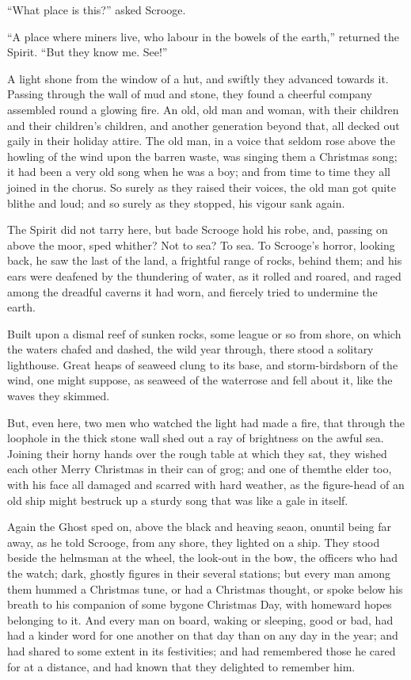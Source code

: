 \documentclass[paper=5.5in:8.5in,BCOR=10mm,twoside,DIV=15,12pt,usegeometry,openany]{scrbook} %
\begin{document}
\enquote{What place is this?} asked Scrooge.

\enquote{A place where miners live, who labour in the bowels of the earth,} returned the Spirit. \enquote{But they know me. See!}

A light shone from the window of a hut, and swiftly they advanced towards it. Passing through the wall of mud and stone, they found a cheerful company assembled round a glowing fire. An old, old man and woman, with their children and their children's children, and another generation beyond that, all decked out gaily in their holiday attire. The old man, in a voice that seldom rose above the howling of the wind upon the barren waste, was singing them a Christmas song; it had been a very old song when he was a boy; and from time to time they all joined in the chorus. So surely as they raised their voices, the old man got quite blithe and loud; and so surely as they stopped, his vigour sank again.

The Spirit did not tarry here, but bade Scrooge hold his robe, and, passing on above the moor, sped whither? Not to sea? To sea. To Scrooge's horror, looking back, he saw the last of the land, a frightful range of rocks, behind them; and his ears were deafened by the thundering of water, as it rolled and roared, and raged among the dreadful caverns it had worn, and fiercely tried to undermine the earth.

Built upon a dismal reef of sunken rocks, some league or so from shore, on which the waters chafed and dashed, the wild year through, there stood a solitary lighthouse. Great heaps of seaweed clung to its base, and storm-birds\textemdash born of the wind, one might suppose, as seaweed of the water\textemdash rose and fell about it, like the waves they skimmed.

But, even here, two men who watched the light had made a fire, that through the loophole in the thick stone wall shed out a ray of brightness on the awful sea. Joining their horny hands over the rough table at which they sat, they wished each other Merry Christmas in their can of grog; and one of them\textemdash the elder too, with his face all damaged and scarred with hard weather, as the figure-head of an old ship might be\textemdash struck up a sturdy song that was like a gale in itself.

Again the Ghost sped on, above the black and heaving sea\textemdash on, on\textemdash until being far away, as he told Scrooge, from any shore, they lighted on a ship. They stood beside the helmsman at the wheel, the look-out in the bow, the officers who had the watch; dark, ghostly figures in their several stations; but every man among them hummed a Christmas tune, or had a Christmas thought, or spoke below his breath to his companion of some bygone Christmas Day, with homeward hopes belonging to it. And every man on board, waking or sleeping, good or bad, had had a kinder word for one another on that day than on any day in the year; and had shared to some extent in its festivities; and had remembered those he cared for at a distance, and had known that they delighted to remember him.
\end{document}
